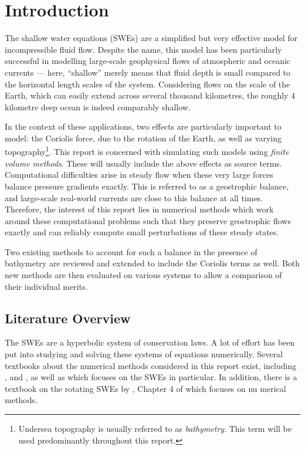 \chapter{Introduction}
\label{ch:introduction}

The shallow water equations (SWEs) are a simplified but very effective model for incompressible fluid flow. Despite the name, this model has been particularly successful in modelling large-scale geophysical flows of atmospheric and oceanic currents --- here, ``shallow'' merely means that fluid depth is small compared to the horizontal length scales of the system. Considering flows on the scale of the Earth, which can easily extend across several thousand kilometres, the roughly 4 kilometre deep ocean is indeed comparably shallow.

In the context of these applications, two effects are particularly important to model: the Coriolis force, due to the rotation of the Earth, as well as varying topography\footnote{Undersea topography is usually referred to as \emph{bathymetry}. This term will be used predominantly throughout this report.}. This report is concerned with simulating such models using \emph{finite volume methods}. These will usually include the above effects as source terms. Computational difficulties arise in steady flow when these very large forces balance pressure gradients exactly. This is referred to as a geostrophic balance, and large-scale real-world currents are close to this balance at all times. Therefore, the interest of this report lies in numerical methods which work around these computational problems such that they preserve geostrophic flows exactly and can reliably compute small perturbations of these steady states.

Two existing methods to account for such a balance in the presence of bathymetry are reviewed and extended to include the Coriolis terms as well. Both new methods are then evaluated on various systems to allow a comparison of their individual merits.

\section{Literature Overview}

The SWEs are a hyperbolic system of conservation laws. A lot of effort has been put into studying and solving these systems of equations numerically. Several textbooks about the numerical methods considered in this report exist, including \citet{leveque1992numerical}, \citet{toro1999riemann} and \citet{leveque2002finite}, as well as \citet{toro2001shock} which focuses on the SWEs in particular. In addition, there is a textbook on the rotating SWEs by \citet{zeitlin2007nonlinear}, Chapter 4 of which focuses on nu merical methods.

